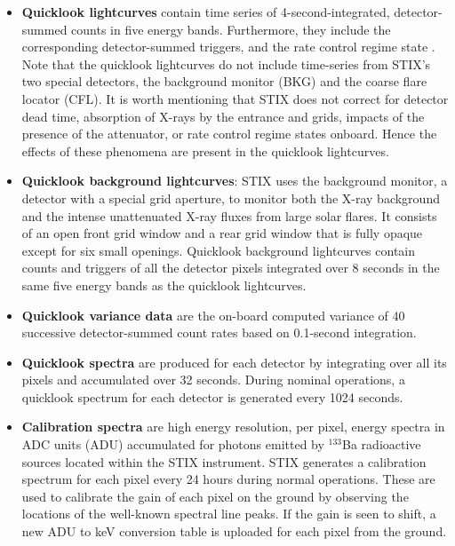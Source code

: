 \documentclass[referee]{preaa} %
\begin{document}
\begin{itemize}
\item {\bf Quicklook lightcurves} contain time series of 4-second-integrated,  detector-summed counts in five energy bands.  Furthermore, they include the corresponding detector-summed triggers, and the rate control regime state \citep[i.e., attenutator state. See ][]{stix2020}.  Note that the quicklook lightcurves do not include time-series from STIX's two special detectors, the background monitor (BKG) and the coarse flare locator (CFL). 
It is worth mentioning that STIX does not correct for detector dead time, absorption of X-rays by the entrance and grids,
impacts of the presence of the attenuator,  or rate control regime states onboard.
Hence the effects of these phenomena are present in the quicklook lightcurves.

\item {\bf Quicklook background lightcurves}: STIX uses the background monitor, a detector with a special grid aperture, to monitor both the X-ray background and the intense unattenuated X-ray fluxes from large solar flares. It consists of an open front grid window and a rear grid window that is fully opaque except for six small openings. Quicklook background lightcurves contain counts and triggers of all the detector pixels integrated over 8 seconds in the same five energy bands as the quicklook lightcurves. 

\item {\bf Quicklook variance data} are the on-board computed variance of 40 successive 
detector-summed count rates based on 0.1-second integration.

\item {\bf Quicklook spectra} are produced for each detector by integrating over all its pixels and accumulated over 32 seconds. During nominal operations, a quicklook spectrum for each detector is generated every 1024 seconds.

\item {\bf Calibration spectra} are high energy resolution, per pixel, energy spectra in ADC units (ADU) accumulated for photons emitted by $^{133}$Ba radioactive sources located within the STIX instrument. 
STIX generates a calibration spectrum for each pixel every 24 hours during normal operations. These are used to calibrate the gain of each pixel on the ground by observing the locations of the well-known spectral line peaks. 
If the gain is seen to shift, a new ADU to keV conversion table is uploaded for each pixel from the ground. 
\end{itemize}
\end{document}
